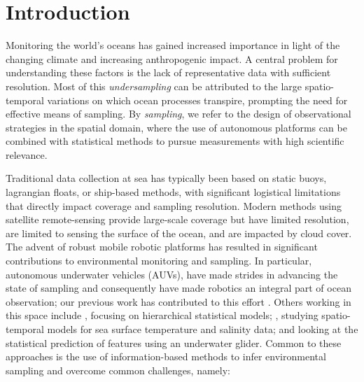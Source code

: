 \documentclass[aoas]{imsart}
\begin{document}
\section{Introduction}

Monitoring the world's oceans has gained increased importance in 
light of the changing climate and increasing anthropogenic impact. A
central problem for understanding these factors is the lack of
representative data with sufficient resolution. Most of this
\emph{undersampling} can be attributed to the large spatio-temporal
variations on which ocean processes transpire, prompting the need for
effective means of sampling. By \emph{sampling}, we refer to the design
of observational strategies in the spatial domain, where the use of
autonomous platforms can be combined with statistical methods to pursue
measurements with high scientific relevance.

Traditional data collection at sea has typically been based on static
buoys, lagrangian floats, or ship-based methods, with significant
logistical limitations that directly impact coverage and sampling
resolution. Modern methods using satellite remote-sensing provide
large-scale coverage but have limited resolution, are limited to
sensing the surface of the ocean, and are impacted by cloud cover. The
advent of robust mobile robotic platforms \cite{Bellingham07} has
resulted in significant contributions to environmental monitoring and
sampling. In particular, autonomous underwater vehicles (AUVs), have made
strides in advancing the state of sampling and consequently have made
robotics an integral part of ocean observation; our previous work
has contributed to this effort
\citep{das11b,Graham2013,das15,Das2015,fossum18b,fossuminformation}.
Others working in this space include \cite{wikle2013modern}, focusing
on hierarchical statistical models; \cite{sahu2008space}, studying
spatio-temporal models for sea surface temperature and salinity data;
and \cite{mellucci2018oceanic} looking at the statistical prediction
of features using an underwater glider. Common to these approaches is
the use of information-based methods to infer environmental sampling
and overcome common challenges, namely:
\end{document}
